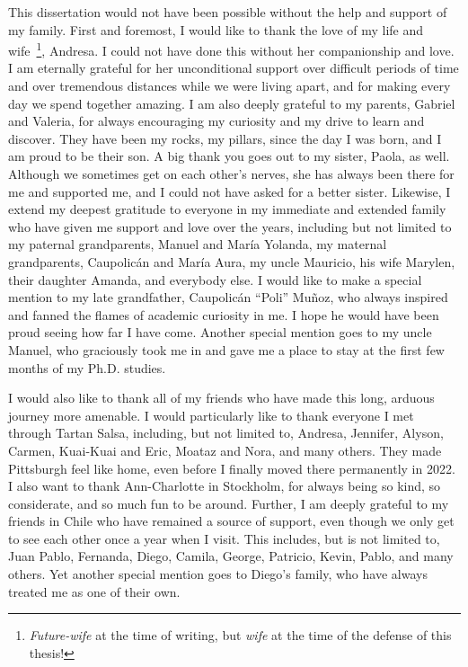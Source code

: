 This dissertation would not have been possible without the help and support of my family.
First and foremost, I would like to thank the love of my life and wife~\footnote{\emph{Future-wife} at the time of writing, but \emph{wife} at the time of the defense of this thesis!}, Andresa.
I could not have done this without her companionship and love.
I am eternally grateful for her unconditional support over difficult periods of time and over tremendous distances while we were living apart, and for making every day we spend together amazing.
I am also deeply grateful to my parents, Gabriel and Valeria, for always encouraging my curiosity and my drive to learn and discover.
They have been my rocks, my pillars, since the day I was born, and I am proud to be their son.
A big thank you goes out to my sister, Paola, as well.
Although we sometimes get on each other's nerves, she has always been there for me and supported me, and I could not have asked for a better sister.
Likewise, I extend my deepest gratitude to everyone in my immediate and extended family who have given me support and love over the years, including but not limited to my paternal grandparents, Manuel and María Yolanda, my maternal grandparents, Caupolicán and María Aura, my uncle Mauricio, his wife Marylen, their daughter Amanda, and everybody else.
I would like to make a special mention to my late grandfather, Caupolicán ``Poli'' Muñoz, who always inspired and fanned the flames of academic curiosity in me.
I hope he would have been proud seeing how far I have come.
Another special mention goes to my uncle Manuel, who graciously took me in and gave me a place to stay at the first few months of my Ph.D. studies.

I would also like to thank all of my friends who have made this long, arduous journey more amenable.
I would particularly like to thank everyone I met through Tartan Salsa, including, but not limited to, Andresa, Jennifer, Alyson, Carmen, Kuai-Kuai and Eric, Moataz and Nora, and many others.
They made Pittsburgh feel like home, even before I finally moved there permanently in 2022.
I also want to thank Ann-Charlotte in Stockholm, for always being so kind, so considerate, and so much fun to be around.
Further, I am deeply grateful to my friends in Chile who have remained a source of support, even though we only get to see each other once a year when I visit.
This includes, but is not limited to, Juan Pablo, Fernanda, Diego, Camila, George, Patricio, Kevin, Pablo, and many others.
Yet another special mention goes to Diego's family, who have always treated me as one of their own.

